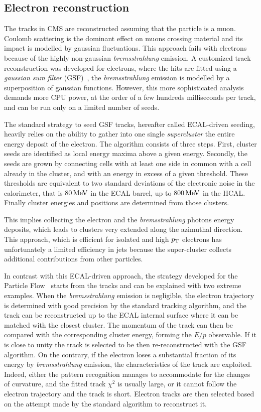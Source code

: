 \subsection{Electron reconstruction}\label{sec:electron_reco}
The tracks in CMS are reconstructed assuming that the particle is a muon.
Coulomb scattering is the dominant effect on muons crossing material and its
impact is modelled by gaussian fluctuations. This approach fails with
electrons because of the highly non-gaussian \emph{bremsstrahlung} emission. A
customized track reconstruction was developed for electrons, where the hits
are fitted using a \emph{gaussian sum filter} (GSF)~\cite{pf:gsf.tracks},
\ie the \emph{bremsstrahlung} emission is modelled by a superposition of
gaussian functions. However, this more sophisticated analysis demands more CPU power, at the order of a few hundreds milliseconds per track, and can be run only on a limited number of seeds.

The standard strategy to seed GSF tracks, hereafter called ECAL-driven seeding, heavily relies on
the ability to gather into one single \emph{supercluster} the entire energy deposit of the electron. 
The algorithm consists of three steps. First, cluster seeds are identified
as local energy maxima above a given energy. Secondly, the seeds are
grown by connecting cells with at least one side in common with
a cell already in the cluster, and with an energy in excess of a given
threshold. These thresholds are equivalent to two standard deviations of the electronic noise in the calorimeter, that is $\unit[80]{MeV}$ in the ECAL barrel, up to $\unit[800]{MeV}$ in the HCAL. Finally cluster energies and positions are determined from those clusters.

This implies collecting the electron and the \emph{bremsstrahlung} photons energy deposits, 
which leads to clusters very extended along the azimuthal direction. 
This approach, which is efficient for isolated and high $p_\mathrm{T}$ electrons has unfortunately 
a limited efficiency in jets because the super-cluster collects 
additional contributions from other particles.

In contrast with this ECAL-driven approach, the strategy developed for the Particle Flow~\cite{pf:electron.reconstruction} starts from
the tracks and can be explained with two extreme examples. 
When the \emph{bremsstrahlung} emission is negligible, the electron
trajectory is determined with good precision by
the standard tracking algorithm, and the track can be reconstructed up to the ECAL internal
surface where it can be matched with the closest cluster. 
The momentum of the track can then be compared with the corresponding cluster energy, 
forming the $E/p$ observable. If it is close to unity the track is selected to be then re-reconstructed
with the GSF algorithm. On the contrary, if the electron loses a substantial fraction of its energy by \emph{bremsstrahlung} emission, the characteristics of the track are exploited. Indeed, either the pattern recognition manages
to accommodate for the changes of curvature, and the fitted track $\chi^2$ is usually large, or
it cannot follow the electron trajectory and the track is short.  
Electron tracks are then selected based on the attempt made by the standard algorithm to reconstruct it. 

